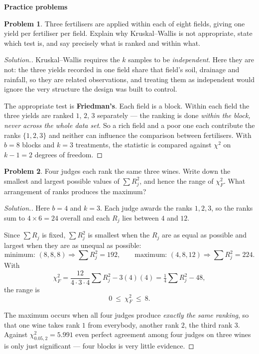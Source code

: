 \documentclass[11pt,a4paper]{article}
\theoremstyle{definition}
\newtheorem{problemx}{Problem}[section]
\newenvironment{problem}{\begin{problemx}}{\end{problemx}}
\newenvironment{solution}
  {\renewcommand{\qedsymbol}{}\begin{proof}[\textit{Solution}.]}
  {\end{proof}}
\begin{document}
\textbf{Practice problems}

\begin{problem}
Three fertilisers are applied within each of eight fields, giving one yield per
fertiliser per field. Explain why Kruskal--Wallis is not appropriate, state which
test is, and say precisely what is ranked and within what.
\end{problem}

\begin{solution}
Kruskal--Wallis requires the $k$ samples to be \emph{independent}. Here they are
not: the three yields recorded in one field share that field's soil, drainage and
rainfall, so they are related observations, and treating them as independent
would ignore the very structure the design was built to control.

The appropriate test is \textbf{Friedman's}. Each field is a block. Within each
field the three yields are ranked $1$, $2$, $3$ separately --- the ranking is done
\emph{within the block, never across the whole data set}. So a rich field and a
poor one each contribute the ranks $\{1,2,3\}$ and neither can influence the
comparison between fertilisers. With $b = 8$ blocks and $k = 3$ treatments, the
statistic is compared against $\chi^{2}$ on $k - 1 = 2$ degrees of freedom.
\end{solution}


\begin{problem}
Four judges each rank the same three wines. Write down the smallest and largest
possible values of $\sum R_j^{2}$, and hence the range of $\chi^{2}_{F}$. What
arrangement of ranks produces the maximum?
\end{problem}

\begin{solution}
Here $b = 4$ and $k = 3$. Each judge awards the ranks $1, 2, 3$, so the ranks sum
to $4 \times 6 = 24$ overall and each $R_j$ lies between $4$ and $12$.

Since $\sum R_j$ is fixed, $\sum R_j^{2}$ is smallest when the $R_j$ are as equal
as possible and largest when they are as unequal as possible:
$$\text{minimum: } (8,8,8) \Rightarrow \sum R_j^{2} = 192,\qquad
\text{maximum: } (4,8,12) \Rightarrow \sum R_j^{2} = 224 .$$
With
$$\chi^{2}_{F} = \dfrac{12}{4 \cdot 3 \cdot 4}\sum R_j^{2} - 3(4)(4)
= \tfrac{1}{4}\sum R_j^{2} - 48,$$
the range is
$$0 \ \leq\ \chi^{2}_{F}\ \leq\ 8 .$$

The maximum occurs when all four judges produce \emph{exactly the same ranking},
so that one wine takes rank $1$ from everybody, another rank $2$, the third rank
$3$. Against $\chi^{2}_{0.05,2} = 5.991$ even perfect agreement among four judges
on three wines is only just significant --- four blocks is very little evidence.
\end{solution}
\end{document}
